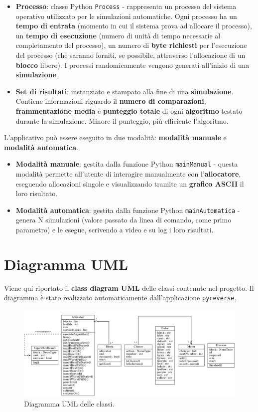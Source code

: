 \documentclass[12pt]{report}
\renewcommand\emph{\textbf}
\begin{document}
\begin{itemize}
            \item \emph{Processo}: classe Python \texttt{Process} - rappresenta un processo del sistema operativo utilizzato per le simulazioni automatiche. Ogni processo ha un \emph{tempo di entrata} (momento in cui il sistema prova ad allocare il processo), un \emph{tempo di esecuzione} (numero di unità di tempo necessarie al completamento del processo), un numero di \emph{byte richiesti} per l'esecuzione del processo (che saranno forniti, se possibile, attraverso l'allocazione di un \emph{blocco} libero). I processi randomicamente vengono generati all'inizio di una \emph{simulazione}.
            \item \emph{Set di risultati}: instanziato e stampato alla fine di una \emph{simulazione}. Contiene informazioni riguardo il \emph{numero di comparazioni}, \emph{frammentazione media} e \emph{punteggio totale} di ogni \emph{algoritmo} testato durante la simulazione. Minore il punteggio, più efficiente l'algoritmo.
        \end{itemize}

        L'applicativo può essere eseguito in due modalità: \emph{modalità manuale} e \emph{modalità automatica}.

        \begin{itemize}
            \item \emph{Modalità manuale}: gestita dalla funzione Python \texttt{mainManual} - questa modalità permette all'utente di interagire manualmente con l'\emph{allocatore}, eseguendo allocazioni singole e visualizzando tramite un \emph{grafico ASCII} il loro risultato.

            \item \emph{Modalità automatica}: gestita dalla funzione Python \texttt{mainAutomatica} - genera N simulazioni (valore passato da linea di comando, come primo parametro) e le esegue, scrivendo a video e su log i loro risultati. 
        \end{itemize}

    \section{Diagramma UML}
        Viene qui riportato il \emph{class diagram UML} delle classi contenute nel progetto.
        Il diagramma è stato realizzato automaticamente dall'applicazione \texttt{pyreverse}.

        \begin{figure}[H]
            \caption{Diagramma UML delle classi.}
            \centering
            \includegraphics[width=1\textwidth]{diatemp}
        \end{figure}
\end{document}

